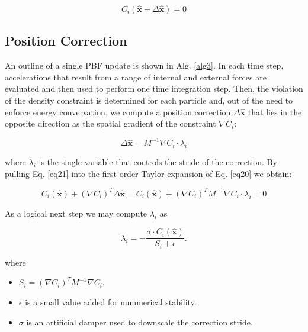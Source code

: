 \documentclass[
	11pt, 
	DIV10,
	ngerman,
	a4paper, 
	oneside, 
	headings=normal, 
	captions=tableheading,
	final, 
	numbers=noenddot
]{scrartcl}
\begin{document}
\begin{equation}
	\label{eq21}
	C_{i}(\hat{\boldsymbol{x}} + \Delta \hat{\boldsymbol{x}}) = 0
\end{equation}

\subsection{Position Correction}

An outline of a single PBF update is shown in Alg. \ref{alg3}. In each time step, accelerations that result from a range of internal and external forces are evaluated and then used to perform one time integration step. Then, the violation of the density constraint is determined for each particle and, out of the need to enforce energy convervation, we compute a position correction $ \Delta \hat{\boldsymbol{x}} $ that lies in the opposite direction as the spatial gradient of the constraint $ \nabla C_{i} $:

\begin{equation}
	\label{eq22}
	\Delta \hat{\boldsymbol{x}} = M^{-1} \nabla C_{i} \cdot \lambda_{i}
\end{equation}

where $ \lambda_{i} $ is the single variable that controls the stride of the correction. By pulling Eq. \eqref{eq21} into the first-order Taylor expansion of Eq. \eqref{eq20} we obtain:

\begin{equation}
	\label{eq23}
	C_{i}(\hat{\boldsymbol{x}}) + (\nabla C_{i})^{T} \Delta \hat{\boldsymbol{x}} = C_{i}(\hat{\boldsymbol{x}}) + (\nabla C_{i})^{T} M^{-1} \nabla C_{i} \cdot \lambda_{i} = 0
\end{equation}

As a logical next step we may compute $ \lambda_{i} $ as

\begin{equation}
	\label{eq24}
	\lambda_{i} = - \frac{\sigma \cdot C_{i}(\hat{\boldsymbol{x}})}{S_{i} + \epsilon}.
\end{equation}

where

\begin{itemize}
    \item $ S_{i} = (\nabla C_{i})^{T} M^{-1} \nabla C_{i} $.
    \item $ \epsilon $ is a small value added for nummerical stability.
    \item $ \sigma $ is an artificial damper used to downscale the correction stride.
\end{itemize}
\end{document}
